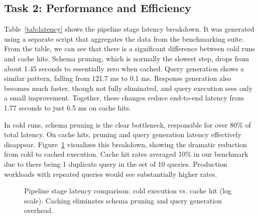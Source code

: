 \documentclass[sigconf]{acmart}
\begin{document}
\subsection{Task 2: Performance and Efficiency}
\label{sec:eval-task2}

Table~\ref{tab:latency} shows the pipeline stage latency breakdown. It was generated using a separate script that aggregates the data from the benchmarking suite. From the table, we can see that there is a significant difference between cold runs and cache hits. Schema pruning, which is normally the slowest step, drops from about 1.45 seconds to essentially zero when cached. Query generation shows a similar pattern, falling from 121.7 ms to 0.1 ms. Response generation also becomes much faster, though not fully eliminated, and query execution sees only a small improvement. Together, these changes reduce end-to-end latency from 1.77 seconds to just 6.5 ms on cache hits.

In cold runs, schema pruning is the clear bottleneck, responsible for over 80\% of total latency. On cache hits, pruning and query generation latency effectively disappear. Figure~\ref{fig:latency} visualizes this breakdown, showing the dramatic reduction from cold to cached execution. Cache hit rates averaged 10\% in our benchmark due to there being 1 duplicate query in the set of 10 queries. Production workloads with repeated queries would see substantially higher rates.

\begin{figure}[t]
  \centering
  \caption{Pipeline stage latency comparison: cold execution vs. cache hit (log scale). Caching eliminates schema pruning and query generation overhead.}
  \label{fig:latency}
\end{figure}
\end{document}
